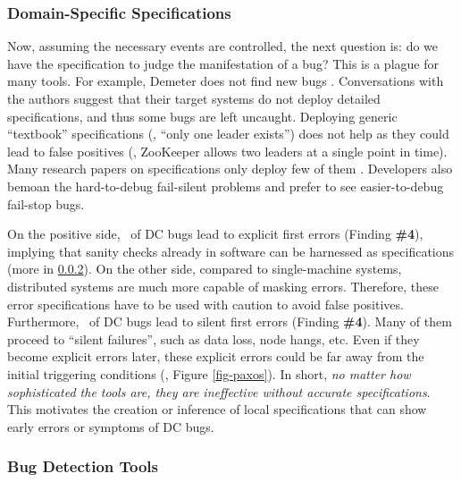 \subsubsection{Domain-Specific Specifications}
\label{less-spec}

Now, assuming the necessary events are controlled, the next question
is: do we have the specification to judge the manifestation of a bug?  
This is a plague for many tools. For example,
Demeter does not find new bugs \cite{Guo+11-Demeter}.
Conversations with the authors suggest that their target systems do
not deploy detailed specifications, and thus some bugs are left
uncaught.  Deploying generic ``textbook'' specifications (\eg, ``only
one leader exists'') does not help as they could lead to false
positives (\eg, ZooKeeper allows two leaders at a single point in
time).  Many research papers on specifications only deploy few of them
\cite{Gunawi+11-FateDestini, Liu+08-D3S, Reynolds+06-Pip}.
Developers also
bemoan the hard-to-debug fail-silent problems  and
prefer to see easier-to-debug fail-stop bugs.  
%

On the positive side, \pctErrExp\ of DC bugs lead to
explicit first errors (Finding {\bf \#4}), implying that sanity checks
already in software can be harnessed as 
specifications
(more in \sec\ref{less-det}). On the other side, compared to
single-machine systems, distributed systems are much more capable
of masking errors. Therefore, these error
specifications have to be used with caution to avoid false 
positives. Furthermore, 
\pctErrImp\ of DC bugs lead to silent first errors (Finding {\bf \#4}).
Many of them proceed to ``silent failures'', such as data loss,
node hangs, etc. Even if they become explicit
errors later, these explicit errors could be far away from the 
initial triggering conditions (\eg, Figure \ref{fig-paxos}).
In short, {\em no matter how sophisticated the tools are, they are
  ineffective without accurate specifications}.
%
This motivates the creation or inference of local specifications
that can show early errors or symptoms of DC bugs.


\subsubsection{Bug Detection Tools}
\label{less-det}


